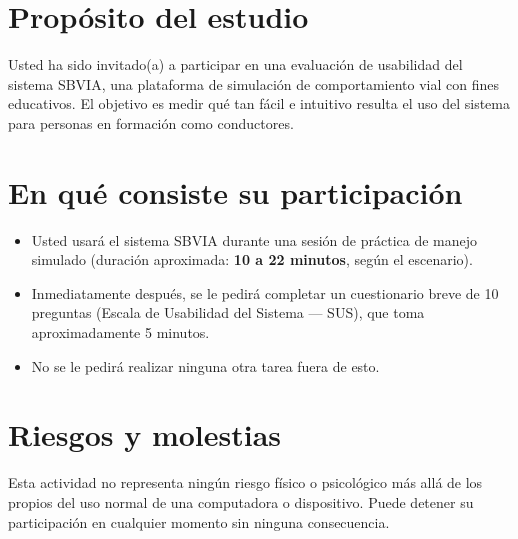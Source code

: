 \documentclass[11pt,a4paper]{article}
\newcommand{\vin}{\textcolor{dorado}{\textbullet}\hspace{1.6mm}}
\begin{document}
\section{Prop\'osito del estudio}
Usted ha sido invitado(a) a participar en una evaluaci\'on de usabilidad del sistema SBVIA, una
plataforma de simulaci\'on de comportamiento vial con fines educativos. El objetivo es medir qu\'e
tan f\'acil e intuitivo resulta el uso del sistema para personas en formaci\'on como conductores.

\section{En qu\'e consiste su participaci\'on}
\begin{itemize}[leftmargin=6mm, label=\vin, itemsep=1.6mm, topsep=1mm, parsep=0pt]
  \item Usted usar\'a el sistema SBVIA durante una sesi\'on de pr\'actica de manejo simulado
        (duraci\'on aproximada: \textbf{10 a 22 minutos}, seg\'un el escenario).
  \item Inmediatamente despu\'es, se le pedir\'a completar un cuestionario breve de 10 preguntas
        (Escala de Usabilidad del Sistema --- SUS), que toma aproximadamente 5 minutos.
  \item No se le pedir\'a realizar ninguna otra tarea fuera de esto.
\end{itemize}

\section{Riesgos y molestias}
Esta actividad no representa ning\'un riesgo f\'isico o psicol\'ogico m\'as all\'a de los propios
del uso normal de una computadora o dispositivo. Puede detener su participaci\'on en cualquier
momento sin ninguna consecuencia.
\end{document}
